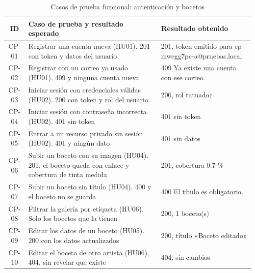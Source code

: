 \documentclass[12pt,letterpaper,oneside]{report}
\begin{document}
\begin{table}[H]
  \centering
  \caption{Casos de prueba funcional: autenticación y bocetos}
  \label{tab:casosauth}
  \renewcommand{\arraystretch}{1.2}
  \footnotesize
  \begin{tabular}{|c|p{5.9cm}|p{5.3cm}|}
    \hline
    \textbf{ID} & \textbf{Caso de prueba y resultado esperado} & \textbf{Resultado obtenido} \\
    \hline
    CP-01 & Registrar una cuenta nueva (HU01). 201 con token y datos del usuario & 201, token emitido para cp-mwegg7pc-a@pruebas.local \\ \hline
    CP-02 & Registrar con un correo ya usado (HU01). 409 y ninguna cuenta nueva & 409 Ya existe una cuenta con ese correo. \\ \hline
    CP-03 & Iniciar sesión con credenciales válidas (HU02). 200 con token y rol del usuario & 200, rol tatuador \\ \hline
    CP-04 & Iniciar sesión con contraseña incorrecta (HU02). 401 sin token & 401 sin token \\ \hline
    CP-05 & Entrar a un recurso privado sin sesión (HU02). 401 y ningún dato & 401 sin datos \\ \hline
    CP-06 & Subir un boceto con su imagen (HU04). 201, el boceto queda con enlace y cobertura de tinta medida & 201, cobertura 0.7 \% \\ \hline
    CP-07 & Subir un boceto sin título (HU04). 400 y el boceto no se guarda & 400 El título es obligatorio. \\ \hline
    CP-08 & Filtrar la galería por etiqueta (HU06). Solo los bocetos que la tienen & 200, 1 boceto(s) \\ \hline
    CP-09 & Editar los datos de un boceto (HU05). 200 con los datos actualizados & 200, título «Boceto editado» \\ \hline
    CP-10 & Editar el boceto de otro artista (HU06). 404, sin revelar que existe & 404, sin cambios \\ \hline
  \end{tabular}
\end{table}
\end{document}
